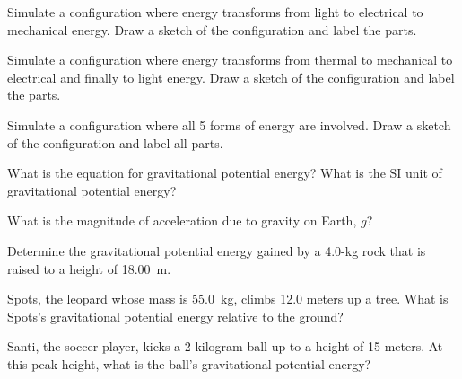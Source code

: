 \documentclass[main.tex]{subfiles}
\begin{document}
\begin{exercise}
    Simulate a configuration where energy transforms from light to electrical to mechanical energy. Draw a sketch of the configuration and label the parts.
\end{exercise}

\begin{exercise}
    Simulate a configuration where energy transforms from thermal to mechanical to electrical and finally to light energy. Draw a sketch of the configuration and label the parts.
\end{exercise}

\begin{exercise} \label{IPOKOY}
    Simulate a configuration where all 5 forms of energy are involved. Draw a sketch of the configuration and label all parts.
\end{exercise}


\cyanhrule



\begin{exercise} \label{xxSTEr}
    What is the equation for gravitational potential energy? What is the SI unit of gravitational potential energy?
\end{exercise}

\begin{exercise}
    What is the magnitude of acceleration due to gravity on Earth, $g$?
\end{exercise}

\begin{exercise} \label{9p9meZ}
Determine the gravitational potential energy gained by a 4.0-kg rock that is raised to a height of \SI{18.00}{m}.
\end{exercise}

\begin{exercise} \label{i6NTnH}
Spots, the leopard whose mass is \SI{55.0}{kg}, climbs 12.0 meters up a tree. What is Spots's gravitational potential energy relative to the ground?
\end{exercise}

\begin{exercise} \label{FAhPt5}
    Santi, the soccer player, kicks a 2-kilogram ball up to a height of 15 meters. At this peak height, what is the ball's gravitational potential energy?
\end{exercise}
\end{document}
